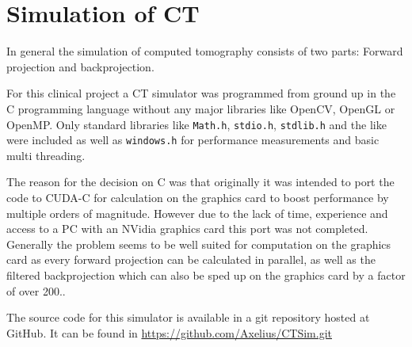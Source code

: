 \chapter{Simulation of CT}
\par In general the simulation of computed tomography consists of two parts: Forward projection and backprojection.
\par For this clinical project a CT simulator was programmed from ground up in the C programming language without any major libraries like OpenCV, OpenGL or OpenMP. Only standard libraries like \verb!Math.h!, \verb!stdio.h!, \verb!stdlib.h! and the like were included as well as \verb!windows.h! for performance measurements and basic multi threading.
\par The reason for the decision on C was that originally it was intended to port the code to CUDA-C for calculation on the graphics card to boost performance by multiple orders of magnitude. However due to the lack of time, experience and access to a PC with an NVidia graphics card this port was not completed. Generally the problem seems to be well suited for computation on the graphics card as every forward projection can be calculated in parallel, as well as the filtered backprojection which can also be sped up on the graphics card by a factor of over 200.\cite{CUDABackprojection}.
\par The source code for this simulator is available in a git repository hosted at GitHub. It can be found in \url{https://github.com/Axelius/CTSim.git}
